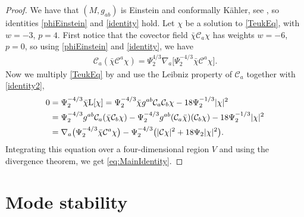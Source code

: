 \documentclass[10pt,a4paper]{amsart}
\numberwithin{equation}{section}
\begin{document}
\begin{proof}
We have that $(M,g_{ab})$ is Einstein and conformally K\"ahler, see \cite{MR707181}, so identities \eqref{phiEinstein} and \eqref{identity} hold.
Let $\chi$ be a solution to \eqref{TeukEq}, with $w=-3$, $p=4$.
First notice that the covector field $\bar\chi\mathcal{C}_{a}\chi$ has weights $w=-6$, $p=0$, so using \eqref{phiEinstein} and \eqref{identity}, we have
\begin{align} \label{identity2}
\mathcal{C}_{a}(\bar\chi\mathcal{C}^{a}\chi) = \Psi_{2}^{4/3}\nabla_{a}\bigl[\Psi_{2}^{-4/3}\bar\chi\mathcal{C}^{a}\chi\bigr].
\end{align}
Now we multiply \eqref{TeukEq} by  and use the Leibniz property of $\mathcal{C}_{a}$ together with \eqref{identity2},
\begin{align*}
 0 ={}& \Psi_{2}^{-4/3}\bar\chi{\rm L}[\chi]
 =  \Psi_{2}^{-4/3}\bar\chi g^{ab}\mathcal{C}_{a}\mathcal{C}_{b}\chi - 18\Psi_{2}^{-1/3}|\chi|^2 \\
 ={}& \Psi_{2}^{-4/3}g^{ab}\mathcal{C}_{a}(\bar\chi \mathcal{C}_{b}\chi) - \Psi_{2}^{-4/3}g^{ab}(\mathcal{C}_{a}\bar\chi)(\mathcal{C}_{b}\chi) - 18\Psi_{2}^{-1/3}|\chi|^2 \\
 ={}& \nabla_{a}\bigl(\Psi_{2}^{-4/3}\bar\chi \mathcal{C}^{a}\chi\bigr) - \Psi_{2}^{-4/3}\bigl(|\mathcal{C}\chi|^{2} + 18\Psi_{2}|\chi|^2\bigr).
\end{align*}
Integrating this equation over a four-dimensional region $V$ and using the divergence theorem, we get \eqref{eq:MainIdentity}.
\end{proof}

\section{Mode stability}
\label{sec:modestability}
\end{document}
